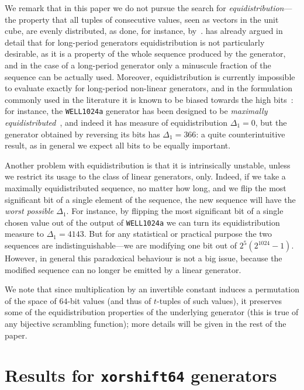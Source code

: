 \documentclass{acmsmalltr}
\newcommand{\xorshift}[1][]{\texttt{xorshift#1}\xspace}
\newcommand{\wella}{\texttt{WELL1024a}\xspace}
\begin{document}
We remark that in this paper we do not pursue the search for
\emph{equidistribution}---the property that all tuples of consecutive values,
seen as vectors in the unit cube, are evenly distributed, as done, for instance,
by~.
 has already argued in detail that for long-period generators
equidistribution is not particularly desirable, as it is a property of the whole
sequence produced by the generator, and in the case of a long-period generator
only a minuscule fraction of the sequence can be actually used.
Moreover, equidistribution is currently impossible to evaluate exactly for
long-period non-linear generators, and in the formulation commonly used in the
literature it is known to be biased towards the high bits~\cite{LEPFRNG}: for
instance, the \wella generator has been designed to be \emph{maximally equidistributed}~\cite{PLMILPGBLRM2}, and indeed it has measure
of equidistribution $\Delta_1=0$, but the generator obtained by reversing its
bits has $\Delta_1=366$: a quite counterintuitive result, as in general we
expect all bits to be equally important.

Another problem with equidistribution is that it is intrinsically unstable,
unless we restrict its usage to the class of linear generators,
only.
Indeed, if we take a maximally equidistributed sequence, no matter how long,
and we flip the most significant bit of a single element of the sequence, the new sequence
will have the \emph{worst possible} $\Delta_1$.
For instance, by flipping the most significant bit of a single chosen value out
of the output of \wella we can turn its equidistribution measure to
$\Delta_1=4143$. But for any statistical or practical purpose the two sequences
are indistinguishable---we are modifying one bit out of $2^5(2^{1024}-1)$.
However, in general this paradoxical behaviour is not a big issue, because the
modified sequence can no longer be emitted by a linear generator.



We note that since multiplication by an invertible constant induces a
permutation of the space of $64$-bit values (and thus of $t$-tuples of such
values), it preserves some of the equidistribution properties of
the underlying generator (this is true of any bijective scrambling function);
more details will be given in the rest of the paper.

\section{Results for \xorshift[64] generators}
\label{sec:resxorshift}
\end{document}
